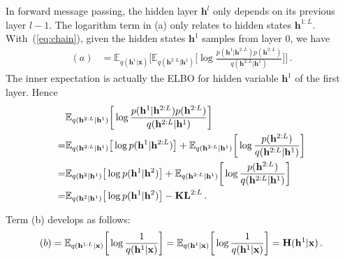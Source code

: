 \documentclass[twoside]{article}
\begin{document}
In forward message passing, the hidden layer $\mathbf{h}^l$  only depends on its previous layer $l-1$. 
The logarithm term in (a) only relates to hidden states $\mathbf{h}^{1:L}$.  
With~(\ref{eq:chain}), given the hidden states $\mathbf{h}^1$ samples from layer 0, we have 
\begin{align} \label{eq:kl_a}
(a)  &=   \mathbb{E}_{q(\mathbf{h}^{1}|\mathbf{x})} \bigg[  \mathbb{E}_{q(\mathbf{h}^{2:L}|\mathbf{h}^1)} \bigg[ \log  \frac{p( \mathbf{h}^{1}|  \mathbf{h}^{2:L}) p( \mathbf{h}^{2:L})  }{ q(\mathbf{h}^{2:L}|\mathbf{h}^1)}  \bigg]    \bigg] \, .
\end{align}
The inner expectation is actually the ELBO for hidden variable $\mathbf{h}^1$ of the first layer. 
Hence
\begin{align} \notag
 &\mathbb{E}_{q(\mathbf{h}^{2:L}|\mathbf{h}^1)} \bigg[ \log  \frac{p( \mathbf{h}^{1}|  \mathbf{h}^{2:L}) p( \mathbf{h}^{2:L})  }{ q(\mathbf{h}^{2:L}|\mathbf{h}^1)}  \bigg]   \\ \notag
 =&\mathbb{E}_{q(\mathbf{h}^{2:L}|\mathbf{h}^1)} \big[ \log p( \mathbf{h}^{1}|  \mathbf{h}^{2:L})    \big] + \mathbb{E}_{q(\mathbf{h}^{2:L}|\mathbf{h}^1)} \bigg[ \log  \frac{ p( \mathbf{h}^{2:L})   }{ q(\mathbf{h}^{2:L}|\mathbf{h}^1)}  \bigg]  \\  \label{eq:a_inner}
 =&  \mathbb{E}_{q(\mathbf{h}^{2}|\mathbf{h}^1)} \big[ \log p( \mathbf{h}^{1}|  \mathbf{h}^{2})    \big] + \mathbb{E}_{q(\mathbf{h}^{2:L}|\mathbf{h}^1)} \bigg[ \log  \frac{ p( \mathbf{h}^{2:L})   }{ q(\mathbf{h}^{2:L}|\mathbf{h}^1)}  \bigg] \\ \notag
  =&  \mathbb{E}_{q(\mathbf{h}^{2}|\mathbf{h}^1)} \big[ \log p( \mathbf{h}^{1}|  \mathbf{h}^{2})    \big] - \textbf{\text{KL}}^{2:L}  \, .
\end{align}

Term (b) develops as follows:
\begin{align} \label{eq:kl_b}
 (b)  = \mathbb{E}_{q(\mathbf{h}^{1:L} | \mathbf{x})} \bigg[ \log \frac{1}{q(\mathbf{h}^{1}|\mathbf{x}) } \bigg] =  \mathbb{E}_{q(\mathbf{h}^{1} | \mathbf{x})} \bigg[ \log \frac{1}{q(\mathbf{h}^{1}|\mathbf{x}) } \bigg] = \textbf{\text{H}}(\mathbf{h}^{1}|\mathbf{x}) \, .
\end{align}
\end{document}
